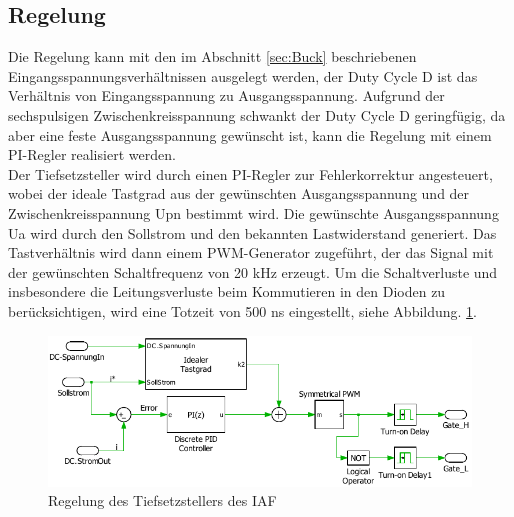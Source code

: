 	\subsection{Regelung}
	Die Regelung kann mit den im Abschnitt \ref{sec:Buck} beschriebenen Eingangsspannungsverhältnissen ausgelegt werden, der Duty Cycle \gls{D} ist das Verhältnis von Eingangsspannung zu Ausgangsspannung. Aufgrund der sechspulsigen Zwischenkreisspannung schwankt der Duty Cycle \gls{D} geringfügig, da aber eine feste Ausgangsspannung gewünscht ist, kann die Regelung mit einem PI-Regler realisiert werden.\\
	Der Tiefsetzsteller wird durch einen PI-Regler zur Fehlerkorrektur angesteuert, wobei der ideale Tastgrad aus der gewünschten Ausgangsspannung und der Zwischenkreisspannung \gls{Upn} bestimmt wird. Die gewünschte Ausgangsspannung \gls{Ua} wird durch den Sollstrom und den bekannten Lastwiderstand generiert. Das Tastverhältnis wird dann einem PWM-Generator zugeführt, der das Signal mit der gewünschten Schaltfrequenz von 20 kHz erzeugt. Um die Schaltverluste und insbesondere die Leitungsverluste beim Kommutieren in den Dioden zu berücksichtigen, wird eine Totzeit von 500 \si{\nano \second} eingestellt, siehe Abbildung. \ref{fig:iafbuckcontrol}.
	\begin{figure}[H]
		\centering
		\includegraphics[width=1\linewidth]{content/Grafiken/IAF_BuckControl}
		\caption{Regelung des Tiefsetzstellers des IAF}
		\label{fig:iafbuckcontrol}
	\end{figure}


